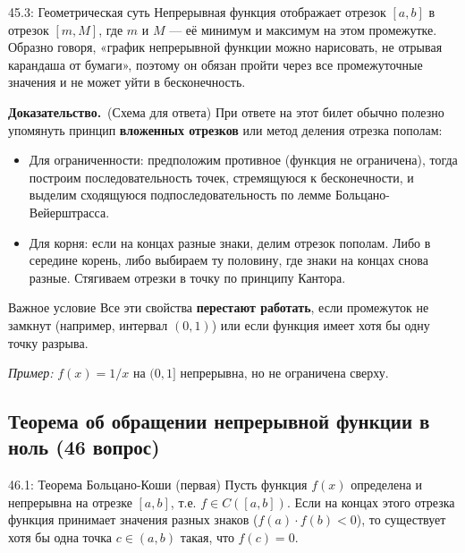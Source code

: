 \documentclass[a4paper,12pt]{article}
\newcommand{\myproof}{\textbf{Доказательство.}\ }
\begin{document}
	\begin{notebook}{45.3: Геометрическая суть}
		Непрерывная функция отображает отрезок $[a, b]$ в отрезок $[m, M]$, где $m$ и $M$ — её минимум и максимум на этом промежутке. Образно говоря, «график непрерывной функции можно нарисовать, не отрывая карандаша от бумаги», поэтому он обязан пройти через все промежуточные значения и не может уйти в бесконечность.
	\end{notebook}
	
	\myproof (Схема для ответа)
	При ответе на этот билет обычно полезно упомянуть принцип \textbf{вложенных отрезков} или метод деления отрезка пополам:
	\begin{itemize}
		\item Для ограниченности: предположим противное (функция не ограничена), тогда построим последовательность точек, стремящуюся к бесконечности, и выделим сходящуюся подпоследовательность по лемме Больцано-Вейерштрасса.
		\item Для корня: если на концах разные знаки, делим отрезок пополам. Либо в середине корень, либо выбираем ту половину, где знаки на концах снова разные. Стягиваем отрезки в точку по принципу Кантора.
	\end{itemize}
	
	\begin{importantbox}{Важное условие}
		Все эти свойства \textbf{перестают работать}, если промежуток не замкнут (например, интервал $(0, 1)$) или если функция имеет хотя бы одну точку разрыва.
		
		\textit{Пример:} $f(x) = 1/x$ на $(0, 1]$ непрерывна, но не ограничена сверху.
	\end{importantbox}
	
	
	
	
	\vspace{1cm}
	\subsection{Теорема об обращении непрерывной функции в ноль (46 вопрос)}
	
	\begin{theorembox}{46.1: Теорема Больцано-Коши (первая)}
		Пусть функция $f(x)$ определена и непрерывна на отрезке $[a, b]$, т.е. $f \in C([a, b])$. 
		Если на концах этого отрезка функция принимает значения разных знаков ($f(a) \cdot f(b) < 0$), то существует хотя бы одна точка $c \in (a, b)$ такая, что $f(c) = 0$.
	\end{theorembox}
	
\end{document}
